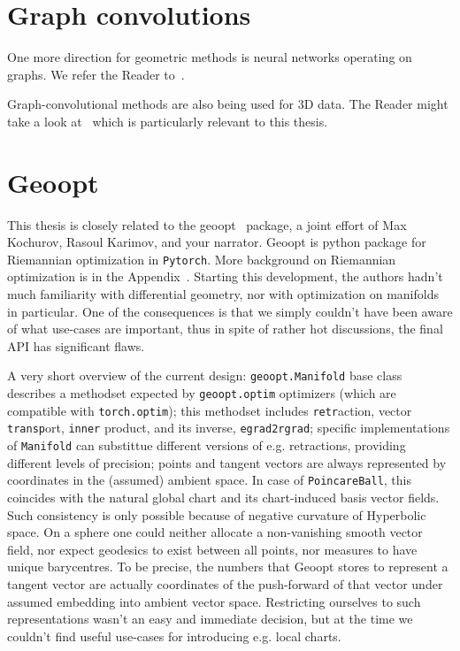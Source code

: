 \section{Graph convolutions}

One more direction for geometric methods is neural networks operating on graphs.
We refer the Reader to~\citet{kipf}.

Graph-convolutional methods are also being used for 3D data. The Reader might
take a look at~\citet{edgeconv} which is particularly relevant to this thesis.

\section{Geoopt} \label{sec:geoopt}

This thesis is closely related to the geoopt~\cite{geoopt} package, a joint
effort of Max Kochurov, Rasoul Karimov, and your narrator.
Geoopt is python package for Riemannian optimization in \texttt{Pytorch}.
More background on Riemannian optimization is in the Appendix~.
Starting this development, the authors hadn't much familiarity with
differential geometry, nor with optimization on manifolds in particular. One of
the consequences is that we simply couldn't have been aware of what use-cases
are important, thus in spite of rather hot discussions, the final API has
significant flaws.

A very short overview of the current design: \texttt{geoopt.Manifold} base
class describes a methodset expected by \texttt{geoopt.optim} optimizers (which
are compatible with \texttt{torch.optim}); this methodset includes
\texttt{retr}action, vector \texttt{transp}ort, \texttt{inner} product, and its
inverse, \texttt{egrad2rgrad}; specific implementations of \texttt{Manifold}
can substittue different versions of e.g. retractions, providing different
levels of precision; points and tangent vectors are always represented by
coordinates in the (assumed) ambient space. In case of \texttt{PoincareBall},
this coincides with the natural global chart and its chart-induced basis vector
fields. Such consistency is only possible because of negative curvature of
Hyperbolic space. On a sphere one could neither allocate a non-vanishing smooth
vector field, nor expect geodesics to exist between all points, nor measures to
have unique barycentres. To be precise, the numbers that Geoopt stores to
represent a tangent vector are actually coordinates of the push-forward of that
vector under assumed embedding into ambient vector space. Restricting ourselves
to such representations wasn't an easy and immediate decision, but at the time
we couldn't find useful use-cases for introducing e.g. local charts.

